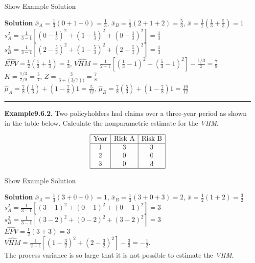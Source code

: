 \documentclass[]{book}
\theoremstyle{definition}
\theoremstyle{definition}
\theoremstyle{definition}
\theoremstyle{remark}
\begin{document}
Show Example Solution

\hypertarget{toggleExampleCred.6.1}{}
\textbf{Solution} \(\bar{x}_A=\frac{1}{3}(0+1+0)=\frac{1}{3}\),
\(\bar{x}_B=\frac{1}{3}(2+1+2)=\frac{5}{3}\),
\(\bar{x}=\frac{1}{2}(\frac{1}{3}+\frac{5}{3})=1\)\\
\(s_A^2=\frac{1}{3-1}\left[(0-\frac{1}{3})^2+(1-\frac{1}{3})^2+(0-\frac{1}{3})^2\right]=\frac{1}{3}\)\\
\(s_B^2=\frac{1}{3-1}\left[(2-\frac{5}{3})^2+(1-\frac{5}{3})^2+(2-\frac{5}{3})^2\right]=\frac{1}{3}\)\\
\(\widehat{EPV}=\frac{1}{2}\left(\frac{1}{3}+\frac{1}{3}\right)=\frac{1}{3}\),
\(\widehat{VHM}=\frac{1}{2-1}\left[(\frac{1}{3}-1)^2+(\frac{5}{3}-1)^2\right]-\frac{1/3}{3}=\frac{7}{9}\)\\
\(K=\frac{1/3}{7/9}=\frac{3}{7}\),
\(Z=\frac{3}{3+(3/7))}=\frac{7}{8}\)\\
\(\hat{\mu}_A=\frac{7}{8}\left(\frac{1}{3}\right)+(1-\frac{7}{8})1=\frac{5}{12}\),
\(\hat{\mu}_B=\frac{7}{8}\left(\frac{5}{3}\right)+(1-\frac{7}{8})1=\frac{19}{12}\)

\begin{center}\rule{0.5\linewidth}{\linethickness}\end{center}

\textbf{Example9.6.2.} Two policyholders had claims over a three-year
period as shown in the table below. Calculate the nonparametric estimate
for the \emph{VHM}.

\[\begin{matrix}
\begin{array}{|c|c|c|}
\hline
\text{Year} & \text{Risk A} & \text{Risk B} \\
\hline
1 & 3 &  3 \\
2 & 0 &  0  \\  
3 & 0 &  3  \\              
\hline
\end{array}
\end{matrix}\]

Show Example Solution

\hypertarget{toggleExampleCred.6.2}{}
\textbf{Solution} \(\bar{x}_A=\frac{1}{3}(3+0+0)=1\),
\(\bar{x}_B=\frac{1}{3}(3+0+3)=2\),
\(\bar{x}=\frac{1}{2}(1+2)=\frac{3}{2}\)\\
\(s_A^2=\frac{1}{3-1}\left[(3-1)^2+(0-1)^2+(0-1)^2\right]=3\)\\
\(s_B^2=\frac{1}{3-1}\left[(3-2)^2+(0-2)^2+(3-2)^2\right]=3\)\\
\(\widehat{EPV}=\frac{1}{2}(3+3)=3\)\\
\(\widehat{VHM}=\frac{1}{2-1}\left[(1-\frac{3}{2})^2+(2-\frac{3}{2})^2\right]-\frac{3}{3}=-\frac{1}{2}.\)\\
The process variance is so large that it is not possible to estimate the
\emph{VHM}.
\end{document}

